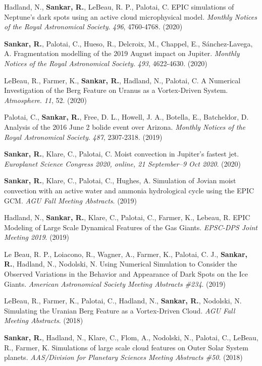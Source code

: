 \item Hadland, N., {\bf Sankar, R.}, LeBeau, R. P., Palotai, C. EPIC simulations of Neptune's dark spots using an active cloud microphysical model. {\it Monthly Notices of the Royal Astronomical Society}. {\it 496}, 4760-4768. (2020)
\item {\bf Sankar, R.}, Palotai, C., Hueso, R., Delcroix, M., Chappel, E., S\'{a}nchez-Lavega, A. Fragmentation modelling of the 2019 August impact on Jupiter. {\it Monthly Notices of the Royal Astronomical Society}. {\it 493}, 4622-4630. (2020)
\item LeBeau, R., Farmer, K., {\bf Sankar, R.}, Hadland, N., Palotai, C. A Numerical Investigation of the Berg Feature on Uranus as a Vortex-Driven System. {\it Atmosphere}. {\it 11}, 52. (2020)
\item Palotai, C., {\bf Sankar, R.}, Free, D. L., Howell, J. A., Botella, E., Batcheldor, D. Analysis of the 2016 June 2 bolide event over Arizona. {\it Monthly Notices of the Royal Astronomical Society}. {\it 487}, 2307-2318. (2019)
\item {\bf Sankar, R.}, Klare, C., Palotai, C. Moist convection in Jupiter's fastest jet. {\it Europlanet Science Congress 2020, online, 21 September–9 Oct 2020}. (2020)
\item {\bf Sankar, R.}, Klare, C., Palotai, C., Hughes, A. Simulation of Jovian moist convection with an active water and ammonia hydrological cycle using the EPIC GCM. {\it AGU Fall Meeting Abstracts}. (2019)
\item Hadland, N., {\bf Sankar, R.}, Klare, C., Palotai, C., Farmer, K., Lebeau, R. EPIC Modeling of Large Scale Dynamical Features of the Gas Giants. {\it EPSC-DPS Joint Meeting 2019}. (2019)
\item Le Beau, R. P., Loiacono, R., Wagner, A., Farmer, K., Palotai, C. J., {\bf Sankar, R.}, Hadland, N., Nodolski, N. Using Numerical Simulation to Consider the Observed Variations in the Behavior and Appearance of Dark Spots on the Ice Giants. {\it American Astronomical Society Meeting Abstracts \#234}. (2019)
\item LeBeau, R., Farmer, K., Palotai, C., Hadland, N., {\bf Sankar, R.}, Nodolski, N. Simulating the Uranian Berg Feature as a Vortex-Driven Cloud. {\it AGU Fall Meeting Abstracts}. (2018)
\item {\bf Sankar, R.}, Hadland, N., Klare, C., Flom, A., Nodolski, N., Palotai, C., LeBeau, R., Farmer, K. Simulations of large scale cloud features on Outer Solar System planets. {\it AAS/Division for Planetary Sciences Meeting Abstracts \#50}. (2018)
